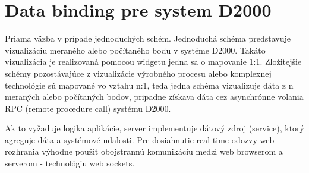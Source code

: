 \section{Data binding pre system D2000}
Priama väzba v prípade jednoduchých schém. Jednoduchá schéma predstavuje vizualizáciu meraného alebo počítaného bodu v systéme D2000. Takáto vizualizácia je realizovaná pomocou widgetu jedna sa o mapovanie 1:1.
Zložitejšie schémy pozostávajúce z vizualizácie výrobného procesu alebo komplexnej technológie sú mapované vo vzťahu n:1, teda jedna schéma vizualizuje dáta z n meraných alebo počítaných bodov, pripadne získava dáta cez asynchrónne volania RPC (remote procedure call) systému D2000.

Ak to vyžaduje logika aplikácie, server implementuje dátový zdroj (service), ktorý agreguje dáta a systémové udalosti. Pre dosiahnutie real-time odozvy web rozhrania výhodne použiť obojstrannú komunikáciu medzi web browserom a serverom - technológiu web sockets.

